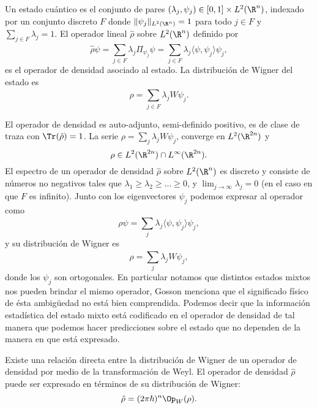   \begin{definition}
    Un estado cuántico es el conjunto de pares $(\lambda_j,
    \psi_j) \in [0,1] \times L^2(\R^{n})$, indexado por un
    conjunto discreto $F$ donde $\|\psi_j\|_{L^2(\R^{n})} =
    1$ para todo $j \in F$ y $\sum_{j \in F} \lambda_j = 1$.
    El operador lineal $\hat{\rho}$ sobre $L^2(\R^{n})$
    definido por
    \begin{equation}
      \hat{\rho} \psi
      = \sum_{j \in F}^{} \lambda_j \Pi_{\psi_j} \psi
      = \sum_{j \in F}^{} \lambda_j \langle \psi, \psi_j
      \rangle \psi_j,
    \end{equation}
    es el operador de densidad asociado al estado. La
    distribución de Wigner del estado es
    \begin{equation}
      \rho = \sum_{j \in F}^{} \lambda_j W\psi_j.
    \end{equation}
  \end{definition}
  El operador de densidad es auto-adjunto, semi-definido
  positivo, es de clase de traza con $\Tr(\hat{\rho}) = 1$.
  La serie $\rho = \sum_{j}^{} \lambda_j W\psi_j$, converge
  en $L^2(\R^{2n})$ y 
  \[
    \rho \in L^2(\R^{2n}) \cap L^{\infty}(\R^{2n}).
  \] 
  El espectro de un operador de densidad $\hat{\rho}$ sobre
  $L^2(\R^{n})$ es discreto y consiste de números no
  negativos tales que $\lambda_1 \geq \lambda_2 \geq \ldots
  \geq 0$, y $\lim_{j \to \infty} \lambda_j = 0$ (en el
  caso en que $F$ es infinito). Junto con los eigenvectores
  $\psi_j$ podemos expresar al operador como
  \[
    \rho \psi
    = \sum_{j}^{} \lambda_j \langle \psi, \psi_j \rangle
    \psi_j,
  \] 
  y su distribución de Wigner es
  \[
    \rho 
    = \sum_{j}^{} \lambda_j W\psi_j,
  \] 
  donde los $\psi_j$ son ortogonales. En particular notamos
  que distintos estados mixtos nos pueden brindar el mismo
  operador, Gosson menciona que el significado físico de
  ésta ambigüedad no está bien comprendida. Podemos decir
  que la información estadística del estado mixto está
  codificado en el operador de densidad de tal manera que
  podemos hacer predicciones sobre el estado que no dependen
  de la manera en que está expresado. 

  Existe una relación directa entre la distribución de
  Wigner de un operador de densidad por medio de la
  transformación de Weyl. El operador de densidad
  $\hat{\rho}$ puede ser expresado en términos de su
  distribución de Wigner:
  \begin{equation}
    \hat{\rho} 
    = (2\pi\hbar)^{n} \Op_W(\rho).
  \end{equation}

